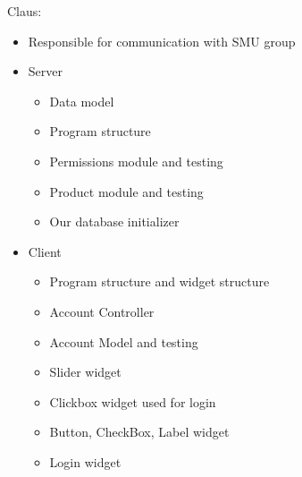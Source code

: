 Claus: 
\begin{itemize}
	\item Responsible for communication with SMU group
	\item Server
	\begin{itemize}
		\item Data model
		\item Program structure
		\item Permissions module and testing
		\item Product module and testing
		\item Our database initializer
	\end{itemize}
	\item Client
	\begin{itemize}
		\item Program structure and widget structure
		\item Account Controller
		\item Account Model and testing
		\item Slider widget
		\item Clickbox widget used for login
		\item Button, CheckBox, Label widget
		\item Login widget
	\end{itemize}
\end{itemize}